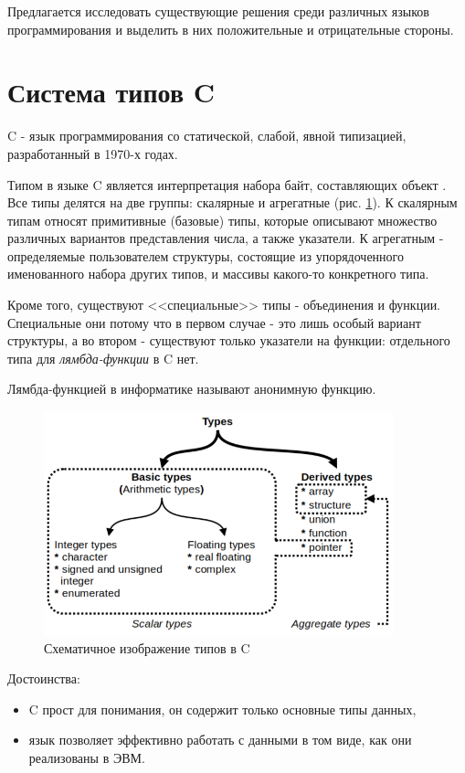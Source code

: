Предлагается исследовать существующие решения среди различных языков программирования и выделить в них положительные и отрицательные стороны.

\section{Система типов C}
\label{sec:c_type_system}

C - язык программирования со статической, слабой, явной типизацией, разработанный в 1970-х годах.

Типом в языке C является интерпретация набора байт, составляющих объект \cite{CSpec}.
Все типы делятся на две группы: скалярные и агрегатные (рис. \ref{fig:c_types}).
К скалярным типам относят примитивные (базовые) типы, которые описывают множество различных вариантов представления числа, а также указатели.
К агрегатным - определяемые пользователем структуры, состоящие из упорядоченного именованного набора других типов, и массивы какого-то конкретного типа.

Кроме того, существуют <<специальные>> типы - объединения и функции.
Специальные они потому что в первом случае - это лишь особый вариант структуры, а во втором - существуют только указатели на функции: отдельного типа для \textit{лямбда-функции} в C нет.

Лямбда-функцией в информатике называют анонимную функцию.

\begin{figure}[H]
    \centering
    \includegraphics[width=0.9\textwidth]{figures/c_types}
    \caption{Схематичное изображение типов в C}
    \label{fig:c_types}
\end{figure}

Достоинства:
\begin{itemize}
    \item C прост для понимания, он содержит только основные типы данных,
    \item язык позволяет эффективно работать с данными в том виде, как они реализованы в ЭВМ.
\end{itemize}

